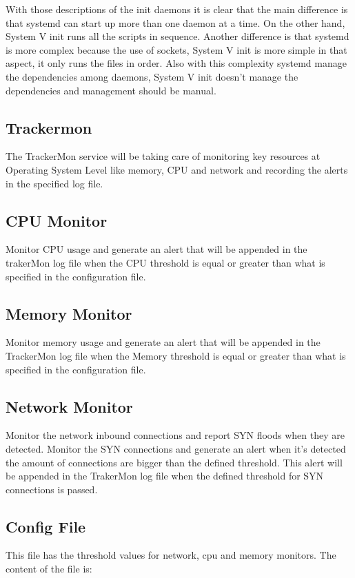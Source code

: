 \documentclass[10pt]{article}
\begin{document}
With those descriptions of the init daemons it is clear that the main difference is that systemd can start up more than one daemon at a time. On the other hand, System V init runs all the scripts in sequence. Another difference is that systemd is more complex because the use of sockets, System V init is more simple in that aspect, it only runs the files in order. Also with this complexity systemd manage the dependencies among daemons, System V init doesn’t manage the dependencies and management should be manual.

\subsection{Trackermon}

The TrackerMon service will be taking care of monitoring key resources at Operating System Level like memory, CPU and network and recording the alerts in the specified log file.

\subsection{CPU Monitor}
Monitor CPU usage and generate an alert that will be appended in the trakerMon log file when the CPU threshold is equal or greater than what is specified in the configuration file.
    
\subsection{Memory Monitor}
Monitor memory usage and generate an alert that will be appended in the TrackerMon log file when the Memory threshold is equal or greater than what is specified in the configuration file.

\subsection{Network Monitor}
Monitor the network inbound connections and report SYN floods when they are detected.
Monitor the SYN connections and generate an alert when it’s detected the amount of connections are bigger than the defined threshold. This alert will be appended in the TrakerMon log file when the defined threshold for SYN connections is passed.

\subsection{Config File}
This file has the threshold values for network, cpu and memory monitors.
The content of the file is:
\end{document}
